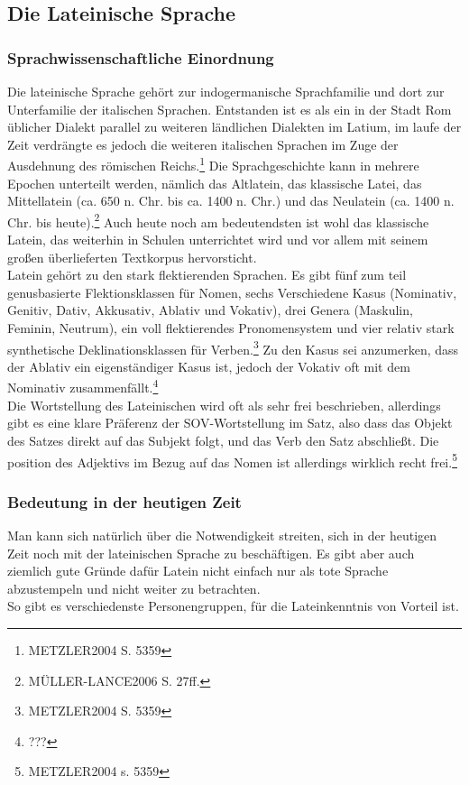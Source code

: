 \documentclass[11pt]{scrartcl}
\begin{document}
\subsection{Die Lateinische Sprache}
\subsubsection{Sprachwissenschaftliche Einordnung}
Die lateinische Sprache gehört zur indogermanische Sprachfamilie und dort zur Unterfamilie der italischen Sprachen. Entstanden ist es als ein in der Stadt Rom üblicher Dialekt parallel zu weiteren ländlichen Dialekten im Latium, im laufe der Zeit verdrängte es jedoch die weiteren italischen Sprachen im Zuge der Ausdehnung des römischen Reichs.\footnote{METZLER2004 S. 5359} Die Sprachgeschichte kann in mehrere Epochen unterteilt werden, nämlich das Altlatein, das klassische Latei, das Mittellatein (ca. 650 n. Chr. bis ca. 1400 n. Chr.) und das Neulatein (ca. 1400 n. Chr. bis heute).\footnote{MÜLLER-LANCE2006 S. 27ff.} Auch heute noch am bedeutendsten ist wohl das klassische Latein, das weiterhin in Schulen unterrichtet wird und vor allem mit seinem großen überlieferten Textkorpus hervorsticht. \\
Latein gehört zu den stark flektierenden Sprachen. Es gibt fünf zum teil genusbasierte Flektionsklassen für Nomen, sechs Verschiedene Kasus (Nominativ, Genitiv, Dativ, Akkusativ, Ablativ und Vokativ), drei Genera (Maskulin, Feminin, Neutrum), ein voll flektierendes Pronomensystem und vier relativ stark synthetische Deklinationsklassen für Verben.\footnote{METZLER2004 S. 5359} Zu den Kasus sei anzumerken, dass der Ablativ ein eigenständiger Kasus ist, jedoch der Vokativ oft mit dem Nominativ zusammenfällt.\footnote{???} \\
Die Wortstellung des Lateinischen wird oft als sehr frei beschrieben, allerdings gibt es eine klare Präferenz der SOV-Wortstellung im Satz, also dass das Objekt des Satzes direkt auf das Subjekt folgt, und das Verb den Satz abschließt. Die position des Adjektivs im Bezug auf das Nomen ist allerdings wirklich recht frei.\footnote{METZLER2004 s. 5359}
\subsubsection{Bedeutung in der heutigen Zeit}
Man kann sich natürlich über die Notwendigkeit streiten, sich in der heutigen Zeit noch mit der lateinischen Sprache zu beschäftigen. Es gibt aber auch ziemlich gute Gründe dafür Latein nicht einfach nur als tote Sprache abzustempeln und nicht weiter zu betrachten. \\
So gibt es verschiedenste Personengruppen, für die Lateinkenntnis von Vorteil ist.
\end{document}
